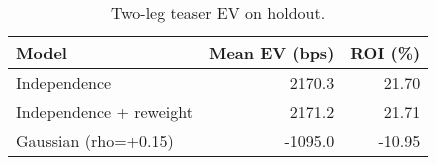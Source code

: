 \begin{table}[t]
  \centering
  \small
  \caption{Two-leg teaser EV on holdout.}
  \begin{tabular}{lrr}
    \toprule
    Model & Mean EV (bps) & ROI (\%) \\
    \midrule
    Independence & 2170.3 & 21.70 \\
    Independence + reweight & 2171.2 & 21.71 \\
    Gaussian (rho=+0.15) & -1095.0 & -10.95 \\
    \bottomrule
  \end{tabular}
\end{table}
